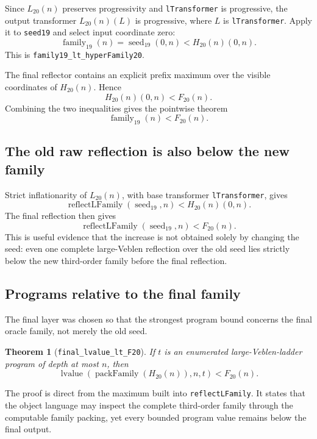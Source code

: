 \documentclass[11pt]{article}
\newtheorem{theorem}{Theorem}[section]
\theoremstyle{definition}
\theoremstyle{remark}
\newcommand{\leanname}[1]{\nolinkurl{#1}}
\begin{document}
Since $L_{20}(n)$ preserves progressivity and \leanname{lTransformer} is
progressive, the output transformer
$L_{20}(n)(L)$ is progressive, where $L$ is \leanname{lTransformer}.  Apply it to
\leanname{seed19} and select input coordinate zero:
\[
  \operatorname{family}_{19}(n)
  =\operatorname{seed}_{19}(0,n)
  <H_{20}(n)(0,n).
\]
This is \leanname{family19_lt_hyperFamily20}.

The final reflector contains an explicit prefix maximum over the visible
coordinates of $H_{20}(n)$.  Hence
\[
  H_{20}(n)(0,n)<F_{20}(n).
\]
Combining the two inequalities gives the pointwise theorem
\begin{equation}
  \operatorname{family}_{19}(n)<F_{20}(n).
  \label{eq:family-domination}
\end{equation}

\subsection{The old raw reflection is also below the new family}

Strict inflationarity of $L_{20}(n)$, with base transformer
\leanname{lTransformer}, gives
\[
  \operatorname{reflectLFamily}(\operatorname{seed}_{19},n)
  <H_{20}(n)(0,n).
\]
The final reflection then gives
\[
  \operatorname{reflectLFamily}(\operatorname{seed}_{19},n)<F_{20}(n).
\]
This is useful evidence that the increase is not obtained solely by changing
the seed: even one complete large-Veblen reflection over the old seed lies
strictly below the new third-order family before the final reflection.

\subsection{Programs relative to the final family}

The final layer was chosen so that the strongest program bound concerns the
final oracle family, not merely the old seed.

\begin{theorem}[\leanname{final_lvalue_lt_F20}]
If $t$ is an enumerated large-Veblen-ladder program of depth at most $n$, then
\[
  \operatorname{lvalue}
     (\operatorname{packFamily}(H_{20}(n)),n,t)
  <F_{20}(n).
\]
\end{theorem}

The proof is direct from the maximum built into
\leanname{reflectLFamily}.  It states that the object language may inspect the
complete third-order family through the computable family packing, yet every
bounded program value remains below the final output.
\end{document}

